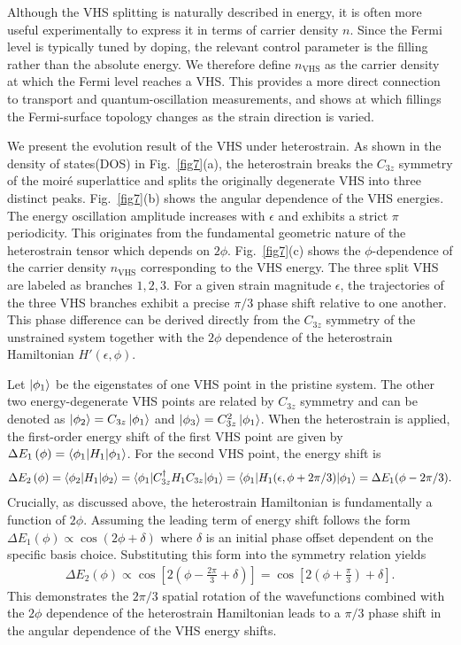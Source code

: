 \documentclass[10pt, oneside]{article}
\newcommand{\p}[1]{\left(#1\right)}
\newcommand{\bb}[1]{\left[#1\right]}
\begin{document}
Although the VHS splitting is naturally described in energy, it is often more useful experimentally to express it in terms of carrier density \(n\). Since the Fermi level is typically tuned by doping, the relevant control parameter is the filling rather than the absolute energy. We therefore define \(n_{\mathrm{VHS}}\) as the carrier density at which the Fermi level reaches a VHS. This provides a more direct connection to transport and quantum-oscillation measurements, and shows at which fillings the Fermi-surface topology changes as the strain direction is varied.

We present the evolution result of the VHS under heterostrain. As shown in the density of states(DOS) in Fig.~\ref{fig7}(a), the heterostrain breaks the \(C_{3z}\) symmetry of the moir\'e superlattice and splits the originally degenerate VHS into three distinct peaks. Fig.~\ref{fig7}(b) shows the angular dependence of the VHS energies. The energy oscillation amplitude increases with \(\epsilon\) and exhibits a strict \(\pi\) periodicity. This originates from the fundamental geometric nature of the heterostrain tensor which depends on \(2 \phi\). Fig.~\ref{fig7}(c) shows the \(\phi\)-dependence of the carrier density \(n_{\mathrm{VHS}}\) corresponding to the VHS energy. The three split VHS are labeled as branches \(1,2,3\). For a given strain magnitude \(\epsilon\), the trajectories of the three VHS branches exhibit a precise \(\pi/3\) phase shift relative to one another. This phase difference can be derived directly from the \(C_{3z}\) symmetry of the unstrained system together with the \(2\phi\) dependence of the heterostrain Hamiltonian \(H'(\epsilon,\phi)\).

Let \(\ket{\phi_1}\) be the eigenstates of one VHS point in the pristine system. The other two energy-degenerate VHS points are related by \(C_{3z}\) symmetry and can be denoted as \(\ket{\phi_2} = C_{3z} \ket{\phi_1}\) and \(\ket{\phi_3} = C_{3z}^2 \ket{\phi_1}\). When the heterostrain is applied, the first-order energy shift of the first VHS point are given by \(\Delta E_1 \p{\phi} = \braket{\phi_1 | H_{1} | \phi_1}\). For the second VHS point, the energy shift is 
\begin{align}
	\Delta E_2 \p{\phi} = \braket{\phi_2 | H_{1} | \phi_2} = \braket{\phi_1 | C_{3z}^\dagger H_{1} C_{3z} | \phi_1} = \braket{\phi_1 | H_{1}(\epsilon, \phi + 2\pi/3) | \phi_1} = \Delta E_1(\phi - 2\pi/3).
\end{align}
Crucially, as discussed above, the heterostrain Hamiltonian is fundamentally a function of \(2 \phi\). Assuming the leading term of energy shift follows the form \(\Delta E_{1} \p{\phi} \propto \cos\p{2 \phi + \delta}\) where \(\delta\) is an initial phase offset dependent on the specific basis choice. Substituting this form into the symmetry relation yields
\begin{align}
	\Delta E_2 \p{\phi} \propto \cos \bb{2 \p{\phi - \frac{2 \pi}{3} + \delta}} =  \cos\bb{2 \p{\phi + \frac{\pi}{3}} +  \delta}.
\end{align}
This demonstrates the \(2 \pi/3\) spatial rotation of the wavefunctions combined with the \(2 \phi\) dependence of the heterostrain Hamiltonian leads to a \(\pi/3\) phase shift in the angular dependence of the VHS energy shifts.
\end{document}
